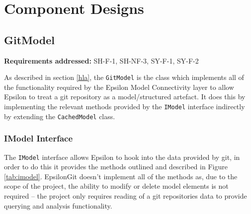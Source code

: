 \documentclass[11pt]{book}
\newcommand{\code}[1]{\texttt{#1}}
\begin{document}
\section{Component Designs}
\subsection{GitModel}
\begin{tcolorbox}
\textbf{Requirements addressed:}  SH-F-1, SH-NF-3, SY-F-1, SY-F-2
\end{tcolorbox}

As described in section \ref{hla}, the \code{GitModel} is the class which implements all of the functionality required by the Epsilon Model Connectivity layer to allow Epsilon to treat a git repository as a model/structured artefact. It does this by implementing the relevant methods provided by the \code{IModel} interface indirectly by extending the \code{CachedModel} class.

\subsubsection{IModel Interface}
The \code{IModel} interface allows Epsilon to hook into the data provided by git, in order to do this it provides the methods outlined and described in Figure \ref{tab:imodel}. EpsilonGit doesn't implement all of the methods as, due to the scope of the project, the ability to modify or delete model elements is not required -- the project only requires reading of a git repositories data to provide querying and analysis functionality.
\end{document}
